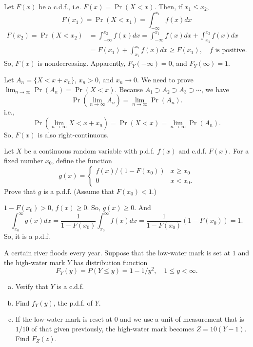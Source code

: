 \documentclass[14pt]{elegantbook}
\begin{document}
    \begin{solution}
        Let $F(x)$ be a c.d.f., i.e. $F(x)=\Pr(X<x)$. Then, if $x_1\leq x_2$, 
        \[F(x_1)=\Pr(X<x_1)=\int_{-\infty}^{x_1}f(x)d x\]
        \begin{align*}
            F(x_2)=\Pr(X<x_2)&=\int_{-\infty}^{x_2}f(x)d x=\int_{-\infty}^{x_1}f(x)d x+\int_{x_1}^{x_2}f(x)d x\\
            &=F(x_1)+\int_{x_1}^{x_2}f(x)d x \geq F(x_1), \quad \text{$f$ is positive}.
        \end{align*}
        So, $F(x)$ is nondecreasing. Apparently, $F_Y(-\infty)=0$, and $F_Y(\infty)=1$. 

        Let $A_n=\{X<x+x_n\}$, $x_n>0$, and $x_n\to 0$. We need to prove $\lim_{n\to\infty}\Pr(A_n)=\Pr(X<x)$. Because $A_1\supset A_2\supset A_3\supset \cdots$, we have
        \[
            \Pr(\lim _{n\to\infty}A_n)=\lim_{n\to\infty}\Pr(A_n). 
        \]
        i.e., 
        \[
            \Pr(\lim_{n\to\infty}X<x+x_n)=\Pr(X<x)=\lim_{n\to\infty}\Pr(A_n). 
        \]
        So, $F(x)$ is also right-continuous. 
    \end{solution}

    \setcounter{exer}{51}
    \begin{exercise}
        Let $X$ be a continuous random variable with p.d.f. $f(x)$ and c.d.f. $F(x)$. For a fixed number $x_0$, define the function
        \[
            g(x)=\left\{\begin{matrix}
                f(x)/(1-F(x_0))&x\geq x_0\\
                0&x<x_0. 
            \end{matrix}\right.
        \]
        Prove that $g$ is a p.d.f. (Assume that $F(x_0)<1$.)
    \end{exercise}

    \begin{solution}
        $1-F(x_0)>0$, $f(x)\geq 0$. So, $g(x)\geq 0$. And \[
            \int_{x_0}^\infty g(x) dx=\frac{1}{1-F(x_0)}\int _{x_0}^\infty f(x) dx=\frac{1}{1-F(x_0)}(1-F(x_0))=1. 
        \]
        So, it is a p.d.f.
    \end{solution}

    \begin{exercise}
        A certain river floods every year. Suppose that the low-water mark is set at $1$ and the high-water mark $Y$ has distribution function 
        \[
            F_Y(y)=P(Y\leq y)=1-1/y^2, \quad 1\leq y <\infty. 
        \]
        \begin{enumerate}[(a)]
            \item Verify that $Y$ is a c.d.f.
            \item Find $f_Y(y)$, the p.d.f. of $Y$.
            \item If the low-water mark is reset at $0$ and we use a unit of measurement that is $1/10$ of that given previously, the high-water mark becomes $Z=10(Y-1)$. Find $F_Z(z)$. 
        \end{enumerate}
    \end{exercise}
\end{document}
